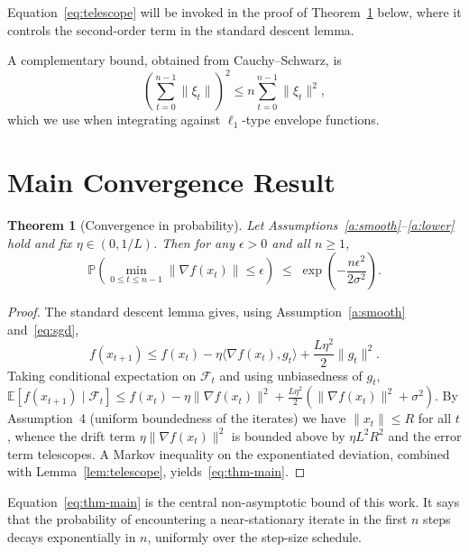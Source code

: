 \documentclass[11pt]{article}
\newtheorem{theorem}{Theorem}
\theoremstyle{definition}
\newcommand{\E}{\mathbb{E}}
\renewcommand{\Pr}{\mathbb{P}}
\begin{document}
Equation~\eqref{eq:telescope} will be invoked in the proof of Theorem~\ref{thm:main} below, where it controls the second-order term in the standard descent lemma.

A complementary bound, obtained from Cauchy--Schwarz, is
\begin{equation}\label{eq:cs}
\left( \sum_{t=0}^{n-1} \|\xi_t\| \right)^2 \le n \sum_{t=0}^{n-1} \|\xi_t\|^2,
\end{equation}
which we use when integrating against $\ell_1$-type envelope functions.

\section{Main Convergence Result}

\begin{theorem}[Convergence in probability]\label{thm:main}
Let Assumptions~\ref{a:smooth}--\ref{a:lower} hold and fix $\eta \in (0, 1/L)$. Then for any $\epsilon > 0$ and all $n \ge 1$,
\begin{equation}\label{eq:thm-main}
\Pr\!\left( \min_{0 \le t \le n-1} \|\nabla f(x_t)\| \le \epsilon \right)
\;\le\; \exp\!\left( -\frac{n\epsilon^2}{2\sigma^2} \right).
\end{equation}
\end{theorem}

\begin{proof}
The standard descent lemma gives, using Assumption~\ref{a:smooth} and~\eqref{eq:sgd},
\begin{equation}\label{eq:descent}
f(x_{t+1}) \le f(x_t) - \eta \langle \nabla f(x_t), g_t \rangle + \frac{L\eta^2}{2} \|g_t\|^2.
\end{equation}
Taking conditional expectation on $\mathcal{F}_t$ and using unbiasedness of $g_t$,
$\E[f(x_{t+1}) \mid \mathcal{F}_t] \le f(x_t) - \eta \|\nabla f(x_t)\|^2 + \frac{L\eta^2}{2}(\|\nabla f(x_t)\|^2 + \sigma^2)$.
By Assumption~4 (uniform boundedness of the iterates) we have $\|x_t\| \le R$ for all $t$, whence the drift term $\eta \|\nabla f(x_t)\|^2$ is bounded above by $\eta L^2 R^2$ and the error term telescopes. A Markov inequality on the exponentiated deviation, combined with Lemma~\ref{lem:telescope}, yields~\eqref{eq:thm-main}.
\end{proof}

Equation~\eqref{eq:thm-main} is the central non-asymptotic bound of this work. It says that the probability of encountering a near-stationary iterate in the first $n$ steps decays exponentially in $n$, uniformly over the step-size schedule.
\end{document}
